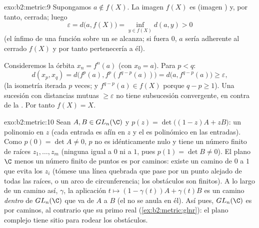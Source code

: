 \begin{solution}{exo:b2:metric:9}
Supongamos $a \notin f(X)$. La imagen $f(X)$ es  (imagen
) y, por tanto, cerrada; luego
\[
\varepsilon = d\bigl(a, f(X)\bigr)
= \inf_{y \in f(X)} d(a, y) > 0
\]
(el ínfimo de una función  sobre un  se alcanza; si
fuera $0$, $a$ sería adherente al cerrado $f(X)$ y por tanto
pertenecería a él).

Consideremos la órbita $x_n = f^n(a)$ (con $x_0 = a$). Para $p < q$:
\[
d(x_p, x_q) = d\bigl(f^p(a), f^p(f^{q-p}(a))\bigr)
= d\bigl(a, f^{q-p}(a)\bigr) \geq \varepsilon,
\]
(la isometría iterada $p$ veces; y $f^{q-p}(a) \in f(X)$ porque $q -
p \geq 1$). Una sucesión con distancias mutuas $\geq \varepsilon$ no
tiene subsucesión convergente, en contra de la . Por
tanto $f(X) = X$.
\end{solution}

\begin{solution}{exo:b2:metric:10}
Sean $A, B \in GL_n(\C)$ y $p(z) = \det\bigl((1-z)A + zB\bigr)$: un
polinomio en $z$ (cada entrada es afín en $z$ y el  es
polinómico en las entradas). Como $p(0) = \det A \neq 0$, $p$ no es
idénticamente nulo y tiene un número finito de raíces $z_1, \dots,
z_m$ (ninguna igual a $0$ ni a $1$, pues $p(1) = \det B \neq 0$). El
plano $\C$ menos un número finito de puntos es  por caminos:
existe un camino de $0$ a $1$ que evita los $z_i$ (tómese una línea
quebrada que pase por un punto alejado de todas las raíces, o un arco
de circunferencia; los obstáculos son finitos). A lo largo de un
camino así, $\gamma$, la aplicación $t \mapsto (1 - \gamma(t))A +
\gamma(t)B$ es un camino  \emph{dentro} de $GL_n(\C)$ que va
de $A$ a $B$ (el  no se anula en él). Así pues,
$GL_n(\C)$ es  por caminos, al contrario que su primo real
(\cref{ex:b2:metric:glnr}): el plano complejo tiene sitio para
rodear los obstáculos.
\end{solution}

